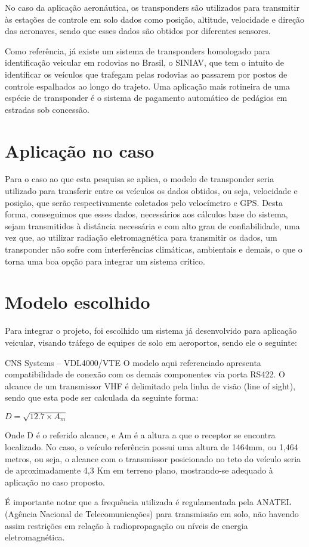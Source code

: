 No caso da aplicação aeronáutica, os transponders são utilizados para
transmitir às estações de controle em solo dados como posição, altitude,
velocidade e direção das aeronaves, sendo que esses dados são obtidos
por diferentes sensores.

Como referência, já existe um sistema de transponders homologado
para identificação veicular em rodovias no Brasil, o SINIAV, que
tem o intuito de identificar os veículos que trafegam pelas
rodovias ao passarem por postos de controle espalhados ao longo do
trajeto. Uma aplicação mais rotineira de uma espécie de transponder
é o sistema de pagamento automático de pedágios em estradas sob concessão.

\section{Aplicação no caso}
Para o caso ao que esta pesquisa se aplica, o modelo de transponder seria
utilizado para transferir entre os veículos os dados obtidos, ou seja,
velocidade e posição, que serão respectivamente coletados pelo velocímetro
e GPS. Desta forma, conseguimos que esses dados, necessários aos cálculos
base do sistema, sejam transmitidos à distância necessária e com alto grau
de confiabilidade, uma vez que, ao utilizar radiação eletromagnética para
transmitir os dados, um transponder não sofre com interferências climáticas,
ambientais e demais, o que o torna uma boa opção para integrar um sistema crítico.

\section{Modelo escolhido}
Para integrar o projeto, foi escolhido um sistema já desenvolvido para aplicação
veicular, visando tráfego de equipes de solo em aeroportos, sendo ele o seguinte:

CNS Systems – VDL4000/VTE \cite{datasheet_transponder}
O modelo aqui referenciado apresenta compatibilidade de conexão com os demais
componentes via porta RS422. O alcance de um transmissor VHF é delimitado pela
 linha de visão (line of sight), sendo que esta pode ser calculada da seguinte
 forma:

 $ D = \sqrt{12.7 \times A_{m}} $

 Onde D é o referido alcance, e Am é a altura a que o receptor se encontra
 localizado. No caso, o veículo referência possui uma altura de 1464mm, ou
 1,464 metros, ou seja, o alcance com o transmissor posicionado no teto do
 veículo seria de aproximadamente 4,3 Km em terreno plano, mostrando-se
 adequado à aplicação no caso proposto.

 É importante notar que a frequência utilizada é regulamentada pela ANATEL
 (Agência Nacional de Telecomunicações) para transmissão em solo, não havendo
  assim restrições em relação à radiopropagação ou níveis de energia
  eletromagnética.
  
